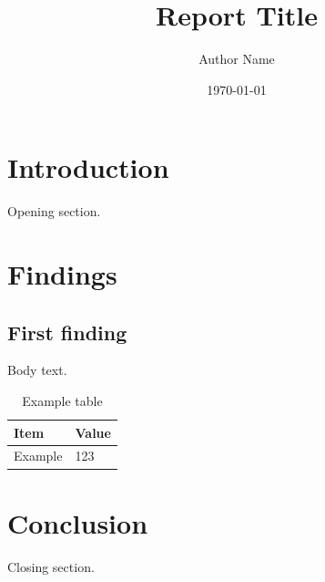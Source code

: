 \documentclass[11pt,a4paper]{report}
\title{Report Title}
\author{Author Name}
\date{\today}
\begin{document}
\maketitle
\tableofcontents

\chapter{Introduction}
Opening section.

\chapter{Findings}
\section{First finding}
Body text.

\begin{table}[h]
\centering
\begin{tabular}{@{}ll@{}}
\toprule
Item & Value \\
\midrule
Example & 123 \\
\bottomrule
\end{tabular}
\caption{Example table}
\end{table}

\chapter{Conclusion}
Closing section.
\end{document}
